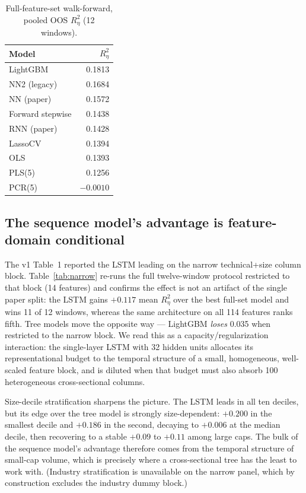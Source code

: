 \documentclass[11pt]{article}
\begin{document}
\begin{table}[h]\centering
\caption{Full-feature-set walk-forward, pooled OOS $R^2_\eta$ (12 windows).}
\label{tab:wf}
\begin{tabular}{lr}
\toprule
Model & $R^2_\eta$ \\
\midrule
LightGBM      & 0.1813 \\
NN2 (legacy)  & 0.1684 \\
NN (paper)    & 0.1572 \\
Forward stepwise & 0.1438 \\
RNN (paper)   & 0.1428 \\
LassoCV       & 0.1394 \\
OLS           & 0.1393 \\
PLS(5)        & 0.1256 \\
PCR(5)        & $-0.0010$ \\
\bottomrule
\end{tabular}
\end{table}

\subsection{The sequence model's advantage is feature-domain conditional}
The v1 Table~1 reported the LSTM leading on the narrow technical+size column
block. Table~\ref{tab:narrow} re-runs the full twelve-window protocol restricted
to that block (14 features) and confirms the effect is not an artifact of the
single paper split: the LSTM gains $+0.117$ mean $R^2_\eta$ over the best
full-set model and wins 11 of 12 windows, whereas the same architecture on all
114 features ranks fifth. Tree models move the opposite way --- LightGBM
\emph{loses} 0.035 when restricted to the narrow block. We read this as a
capacity/regularization interaction: the single-layer LSTM with 32 hidden units
allocates its representational budget to the temporal structure of a small,
homogeneous, well-scaled feature block, and is diluted when that budget must
also absorb 100 heterogeneous cross-sectional columns.

Size-decile stratification sharpens the picture. The LSTM leads in all ten
deciles, but its edge over the tree model is strongly size-dependent: $+0.200$
in the smallest decile and $+0.186$ in the second, decaying to $+0.006$ at the
median decile, then recovering to a stable $+0.09$ to $+0.11$ among large caps.
The bulk of the sequence model's advantage therefore comes from the temporal
structure of small-cap volume, which is precisely where a cross-sectional tree
has the least to work with. (Industry stratification is unavailable on the
narrow panel, which by construction excludes the industry dummy block.)
\end{document}
